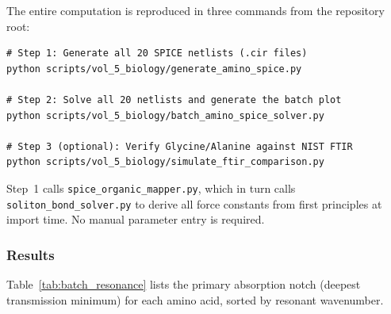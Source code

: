 The entire computation is reproduced in three commands from the repository root:

\begin{verbatim}
# Step 1: Generate all 20 SPICE netlists (.cir files)
python scripts/vol_5_biology/generate_amino_spice.py

# Step 2: Solve all 20 netlists and generate the batch plot
python scripts/vol_5_biology/batch_amino_spice_solver.py

# Step 3 (optional): Verify Glycine/Alanine against NIST FTIR
python scripts/vol_5_biology/simulate_ftir_comparison.py
\end{verbatim}

\noindent Step~1 calls \texttt{spice\_organic\_mapper.py}, which in turn calls \texttt{soliton\_bond\_solver.py} to derive all force constants from first principles at import time. No manual parameter entry is required.

\subsubsection{Results}

Table~\ref{tab:batch_resonance} lists the primary absorption notch (deepest transmission minimum) for each amino acid, sorted by resonant wavenumber.

